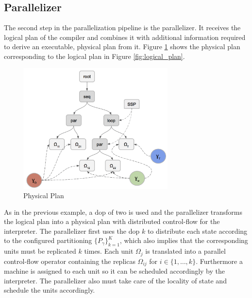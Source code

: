 \subsection{Parallelizer}
The second step in the parallelization pipeline is the parallelizer.
It receives the logical plan of the compiler and combines it with additional information required to derive an executable, physical plan from it.
Figure \ref{fig:physical_plan} shows the physical plan corresponding to the logical plan in Figure \ref{fig:logical_plan}.
\begin{figure}[ht]
\centering
\includegraphics[width=0.7\textwidth]{img/physical_plan.png}
\caption{Physical Plan}
\label{fig:physical_plan}
\end{figure}
As in the previous example, a dop of two is used and the parallelizer transforms the logical plan into a physical plan with distributed control-flow for the interpreter.
The parallelizer first uses the dop $k$ to distribute each state according to the configured partitioning $\{P_{\gamma}\}_{k=1}^K$, which also implies that the corresponding units must be replicated $k$ times.
Each unit $\Omega_j$ is translated into a parallel control-flow operator containing the replicas $\Omega_{ij}$ for $i \in \{1, \ldots, k\}$.
Furthermore a machine is assigned to each unit so it can be scheduled accordingly by the interpreter.
The parallelizer also must take care of the locality of state and schedule the units accordingly.
